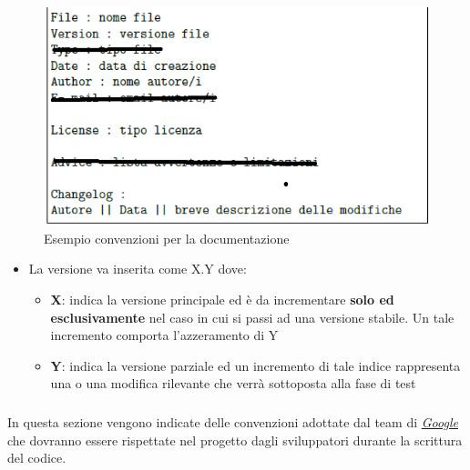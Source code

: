 \begin{figure} [h]
\includegraphics[width=1\textwidth]{../includes/pics/foto2_4.png}
\caption{Esempio convenzioni per la documentazione}
\end{figure}
\begin{itemize}
	\item La versione va inserita come X.Y dove:
	\begin{itemize}
		\item \textbf{X}: indica la versione principale ed è da incrementare \textbf{solo ed esclusivamente} nel caso in cui si passi ad una versione stabile. Un tale incremento comporta l’azzeramento di Y
		\item \textbf{Y}: indica la versione parziale ed un incremento di tale indice rappresenta una  o una modifica rilevante che verrà sottoposta alla fase di test
	\end{itemize}
\end{itemize}
\subsubsection{}
In questa sezione vengono indicate delle convenzioni adottate dal team di 
\href{https://google.github.io/styleguide/javaguide.html}\emph{Google} che dovranno essere rispettate nel progetto dagli sviluppatori durante la scrittura del codice.
